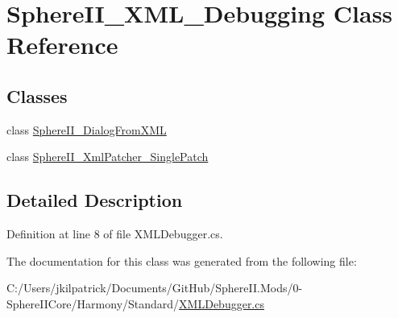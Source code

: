 \hypertarget{class_sphere_i_i___x_m_l___debugging}{}\section{Sphere\+I\+I\+\_\+\+X\+M\+L\+\_\+\+Debugging Class Reference}
\label{class_sphere_i_i___x_m_l___debugging}
\subsection*{Classes}
\begin{DoxyCompactItemize}
\item 
class \mbox{\hyperlink{class_sphere_i_i___x_m_l___debugging_1_1_sphere_i_i___dialog_from_x_m_l}{Sphere\+I\+I\+\_\+\+Dialog\+From\+X\+ML}}
\item 
class \mbox{\hyperlink{class_sphere_i_i___x_m_l___debugging_1_1_sphere_i_i___xml_patcher___single_patch}{Sphere\+I\+I\+\_\+\+Xml\+Patcher\+\_\+\+Single\+Patch}}
\end{DoxyCompactItemize}


\subsection{Detailed Description}


Definition at line 8 of file X\+M\+L\+Debugger.\+cs.



The documentation for this class was generated from the following file\+:\begin{DoxyCompactItemize}
\item 
C\+:/\+Users/jkilpatrick/\+Documents/\+Git\+Hub/\+Sphere\+I\+I.\+Mods/0-\/\+Sphere\+I\+I\+Core/\+Harmony/\+Standard/\mbox{\hyperlink{_x_m_l_debugger_8cs}{X\+M\+L\+Debugger.\+cs}}\end{DoxyCompactItemize}

